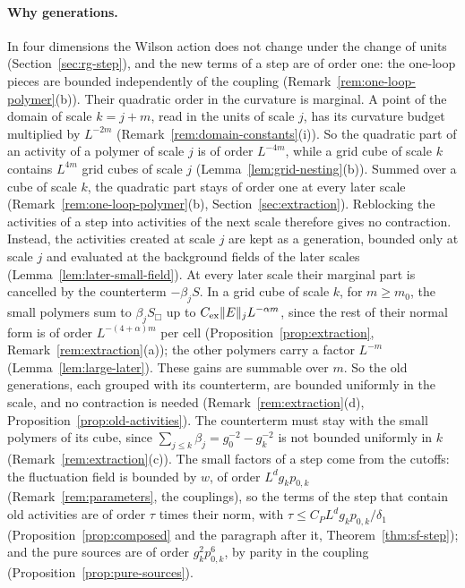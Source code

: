 \paragraph{Why generations.} In four dimensions the Wilson action does not change under the change of units (Section~\ref{sec:rg-step}), and the new terms of a step are of order one: the one-loop pieces are bounded independently of the coupling (Remark~\ref{rem:one-loop-polymer}(b)). Their quadratic order in the curvature is marginal. A point of the domain of scale $k=j+m$, read in the units of scale $j$, has its curvature budget multiplied by $L^{-2m}$ (Remark~\ref{rem:domain-constants}(i)). So the quadratic part of an activity of a polymer of scale $j$ is of order $L^{-4m}$, while a grid cube of scale $k$ contains $L^{4m}$ grid cubes of scale $j$ (Lemma~\ref{lem:grid-nesting}(b)). Summed over a cube of scale $k$, the quadratic part stays of order one at every later scale (Remark~\ref{rem:one-loop-polymer}(b), Section~\ref{sec:extraction}). Reblocking the activities of a step into activities of the next scale therefore gives no contraction. Instead, the activities created at scale $j$ are kept as a generation, bounded only at scale $j$ and evaluated at the background fields of the later scales (Lemma~\ref{lem:later-small-field}). At every later scale their marginal part is cancelled by the counterterm $-\beta_jS$. In a grid cube of scale $k$, for $m\ge m_0$, the small polymers sum to $\beta_jS_\Box$ up to $C_{\rm ex}\|E\|_jL^{-\alpha m}$, since the rest of their normal form is of order $L^{-(4+\alpha)m}$ per cell (Proposition~\ref{prop:extraction}, Remark~\ref{rem:extraction}(a)); the other polymers carry a factor $L^{-m}$ (Lemma~\ref{lem:large-later}). These gains are summable over $m$. So the old generations, each grouped with its counterterm, are bounded uniformly in the scale, and no contraction is needed (Remark~\ref{rem:extraction}(d), Proposition~\ref{prop:old-activities}). The counterterm must stay with the small polymers of its cube, since $\sum_{j\le k}\beta_j=g_0^{-2}-g_k^{-2}$ is not bounded uniformly in $k$ (Remark~\ref{rem:extraction}(c)). The small factors of a step come from the cutoffs: the fluctuation field is bounded by $w$, of order $L^dg_kp_{0,k}$ (Remark~\ref{rem:parameters}, the couplings), so the terms of the step that contain old activities are of order $\tau$ times their norm, with $\tau\le C_PL^dg_kp_{0,k}/\delta_1$ (Proposition~\ref{prop:composed} and the paragraph after it, Theorem~\ref{thm:sf-step}); and the pure sources are of order $g_k^2p_{0,k}^6$, by parity in the coupling (Proposition~\ref{prop:pure-sources}).

